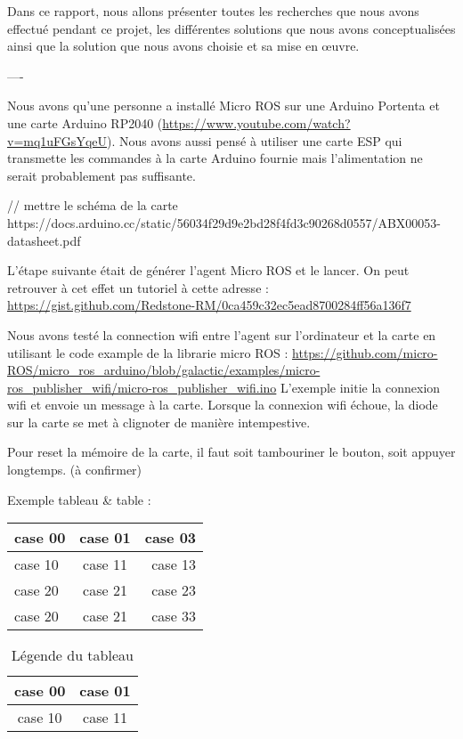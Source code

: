 Dans ce rapport, nous allons présenter toutes les recherches que nous avons effectué pendant ce projet, les différentes 
solutions que nous avons conceptualisées ainsi que la solution que nous avons choisie et sa mise en œuvre. 
\linebreak

----

Nous avons qu'une personne a installé Micro ROS sur une Arduino Portenta et une carte Arduino RP2040 (\url{https://www.youtube.com/watch?v=mq1uFGsYqeU}).
Nous avons aussi pensé à utiliser une carte ESP qui transmette les commandes à la carte Arduino fournie mais l'alimentation ne serait probablement pas suffisante.

// mettre le schéma de la carte
https://docs.arduino.cc/static/56034f29d9e2bd28f4fd3c90268d0557/ABX00053-datasheet.pdf

L'étape suivante était de générer l'agent Micro ROS et le lancer. On peut retrouver à cet effet un tutoriel à cette adresse :
\url{https://gist.github.com/Redstone-RM/0ca459c32ec5ead8700284ff56a136f7}\linebreak

Nous avons testé la connection wifi entre l'agent sur l'ordinateur et la carte en utilisant le code example de la librarie micro ROS :
\url{https://github.com/micro-ROS/micro_ros_arduino/blob/galactic/examples/micro-ros_publisher_wifi/micro-ros_publisher_wifi.ino}
L'exemple initie la connexion wifi et envoie un message à la carte.
Lorsque la connexion wifi échoue, la diode sur la carte se met à clignoter de manière intempestive.\linebreak

Pour reset la mémoire de la carte, il faut soit tambouriner le bouton, soit appuyer longtemps. (à confirmer)

Exemple tableau \& table : 

\begin{tabular}{|l|c|r|}
	\hline \textbf{case 00} & \textbf{case 01} & \textbf{case 03} \\
	\hline case 10 & case 11 & case 13 \\ 
	case 20 & case 21 & case 23 \\ 
	case 20 & case 21 & case 33 \\ 
	\hline
\end{tabular}

\begin{table}
\begin{center}
	\begin{tabular}{|c|c|}
		\hline case 00 & case 01 \\
		\hline case 10 & case 11 \\ 
		\hline 
	\end{tabular}
	\caption{Légende du tableau}
\end{center}
\end{table}


